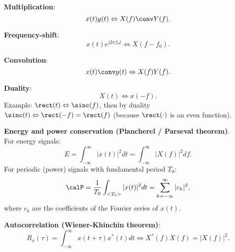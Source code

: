 \textbf{Multiplication}:
\begin{equation}
x(t) y(t) \Leftrightarrow X(f) \conv Y(f).
\label{eq:fourierMultiplication}
\end{equation}

\textbf{Frequency-shift}: 
\begin{equation}
x(t) e^{j 2 \pi f_0 t} \Leftrightarrow X(f - f_0).
\label{eq:fourierFrequencyShift}
\end{equation}

\textbf{Convolution}:
\begin{equation}
x(t) \conv y(t) \Leftrightarrow X(f) Y(f).
\label{eq:fourierConvolution}
\end{equation}


\textbf{Duality}: 
\begin{equation}
X(t) \Leftrightarrow x(-f).
\label{eq:fourierDuality}
\end{equation}
Example: $\rect(t) \Leftrightarrow \sinc(f)$, then by duality $\sinc(t) \Leftrightarrow \rect(-f) = \rect(f)$ (because $\rect(\cdot)$ is an even function).

\textbf{Energy and power conservation (Plancherel / Parseval theorem)}.\\
For energy signals:
\begin{equation}
E=\int_{-\infty}^{\infty} |x(t)|^2 dt = \int_{-\infty}^{\infty} |X(f)|^2 df.
\label{eq:parsevalEnergy}
\end{equation}
For periodic (power) signals with fundamental period $T_0$:
\begin{equation}
\calP=\frac{1}{T_0}\int_{<T_0>} |x(t)|^2 dt = \sum_{k=-\infty}^{\infty} |c_k|^2,
\label{eq:parsevalPower}
\end{equation}
where $c_k$ are the coefficients of the Fourier series of $x(t)$.

\textbf{Autocorrelation (Wiener-Khinchin theorem)}:
\begin{equation}
R_{x}(\tau) = \int_{-\infty}^{\infty} x(t+\tau) x^*(t) dt \Leftrightarrow X^*(f) X(f) = |X(f)|^2.
\label{eq:Wiener-Khinchin}
\end{equation}

